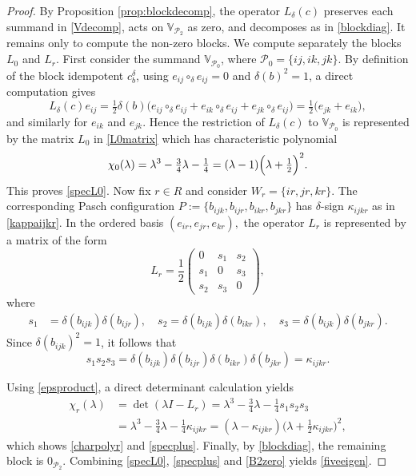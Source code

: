 \documentclass[times,11pt,reqno]{amsproc}
\theoremstyle{definition}
\numberwithin{equation}{section}
\def\valg{\mathbb{V}}
\begin{document}
\begin{proof}
By Proposition \ref{prop:blockdecomp}, the operator $L_\delta(c)$ preserves each summand in \eqref{Vdecomp}, acts on $\valg_{\mathcal{P}_2}$ as zero, and decomposes as in \eqref{blockdiag}. It remains only to compute the non-zero blocks. We compute separately the blocks $L_0$ and $L_r$.
First consider the summand $\valg_{\mathcal{P}_0}$, where $\mathcal{P}_0=\{ij,ik,jk\}$.
By definition of the block idempotent $c_b^\delta$, using $e_{ij}\circ_\delta e_{ij}=0$ and $\delta(b)^2=1$, a direct computation gives
$$
L_\delta(c)e_{ij}
=
\tfrac12\delta(b)\bigl(e_{ij}\circ_\delta e_{ij}+e_{ik}\circ_\delta e_{ij}+e_{jk}\circ_\delta e_{ij}\bigr)
=
\tfrac12\bigl(e_{jk}+e_{ik}\bigr),
$$
and similarly for $e_{ik}$ and $e_{jk}$. Hence the restriction of $L_\delta(c)$ to $\valg_{\mathcal{P}_0}$ is represented by the matrix $L_{0}$ in \eqref{L0matrix} which has characteristic polynomial
$$
\chi_0(\lambda)
=
\lambda^3-\tfrac34\lambda-\tfrac14 =
(\lambda-1)\Bigl(\lambda+\tfrac12\Bigr)^2.
$$
This proves \eqref{specL0}.
Now fix $r\in R$ and consider $W_r=\{ir,jr,kr\}$. The corresponding Pasch configuration $
P:=\{b_{ijk},
b_{ijr},
b_{ikr},
b_{jkr}\}
$ has $\delta$-sign $\kappa_{ijkr}$ as in \eqref{kappaijkr}.
In the ordered basis $(e_{ir},e_{jr},e_{kr}),$
the operator $L_r$ is represented by a matrix of the form
$$
L_r
=
\frac12
\begin{pmatrix}
0&s_1&s_2\\
s_1&0&s_3\\
s_2&s_3&0
\end{pmatrix},
$$
where
\begin{align}
s_1&=\delta(b_{ijk})\delta(b_{ijr}),
\quad
s_2=\delta(b_{ijk})\delta(b_{ikr}),
\quad
s_3=\delta(b_{ijk})\delta(b_{jkr}).
\label{eps3}
\end{align}
Since $\delta(b_{ijk})^2=1$, it follows that
\begin{equation}\label{epsproduct}
s_1s_2s_3
=
\delta(b_{ijk})
\delta(b_{ijr})
\delta(b_{ikr})
\delta(b_{jkr})
=
\kappa_{ijkr}.
\end{equation}


Using \eqref{epsproduct}, a  direct determinant calculation yields
$$
\begin{aligned}
\chi_r(\lambda)&=\det(\lambda I-L_r) =\lambda^3-\tfrac34\lambda-\tfrac14 s_1s_2s_3
\\&= \lambda^3-\tfrac34\lambda-\tfrac14\kappa_{ijkr}  = (\lambda-\kappa_{ijkr})\bigl(\lambda+\tfrac12 \kappa_{ijkr}\bigr)^2,
\end{aligned}
$$
which shows \eqref{charpolyr} and \eqref{specplus}.
Finally, by \eqref{blockdiag}, the remaining block is $0_{\mathcal{P}_2}$. Combining \eqref{specL0}, \eqref{specplus} and \eqref{B2zero} yields \eqref{fiveeigen}.
\end{proof}
\end{document}
